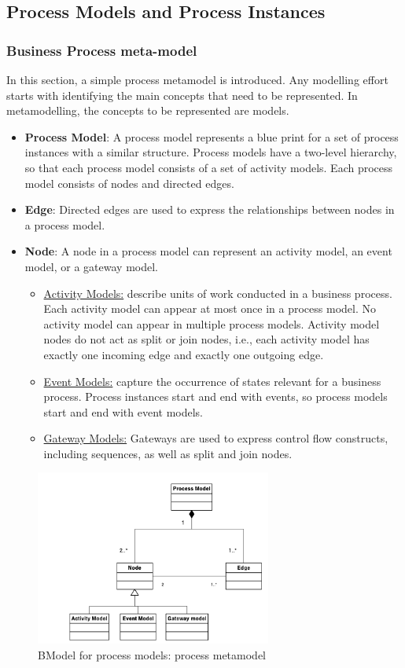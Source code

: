 \documentclass[10pt,a4paper]{article}
\begin{document}
\subsection{Process Models and Process Instances}
\subsubsection{Business Process meta-model}
In this section, a simple process metamodel is introduced. Any modelling effort starts with identifying the main concepts that need to be represented. In metamodelling, the concepts to be represented are models.
\begin{itemize}
	\item \textbf{Process Model}: A process model represents a blue print for a set of process instances with a similar structure. Process models have a two-level hierarchy, so that each process model consists of a set of activity models. Each process model consists of nodes and directed edges.
	\item \textbf{Edge}: Directed edges are used to express the relationships between nodes in a process model.
	\item \textbf{Node}: A node in a process model can represent an activity model, an event model, or a gateway model.
	\begin{itemize}
		\item \uline{Activity Models:} describe units of work conducted in
a business process. Each activity model can appear at most once in a process model. No activity model can appear in multiple process models. Activity model nodes do not act as split or join nodes, i.e., each activity model has exactly one incoming edge and exactly one outgoing edge.
		\item \uline{Event Models:} capture the occurrence of states relevant for a business process. Process instances start and end with events, so process models start and end with event models.
		\item \uline{Gateway Models:} Gateways are used to express control flow constructs, including sequences, as well as split and join nodes.
	\end{itemize}
\end{itemize}
\begin{figure}[ht!]
 \hfill \includegraphics[width=220pt]{images/bpm-process-model}\hspace*{\fill}
 \caption{BModel for process models: process metamodel}
  \label{fig:bpm-process-model}
\end{figure}
\end{document}
